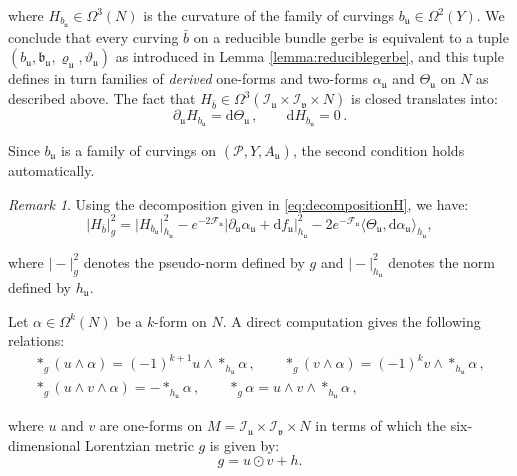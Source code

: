 \documentclass[10pt,a4paper,twoside,reqno]{amsart}
\theoremstyle{plain}
\theoremstyle{definition}
\theoremstyle{remark}
\newtheorem{remark}[thm]{Remark}
\def\dd{\mathrm{d}}
\def\cI{\mathcal{I}}
\def\cP{\mathcal{P}}
\def\cP{\mathcal{P}}
\def\cF{\mathcal{F}}
\def\dd{\mathrm{d}}
\def\fru{\mathfrak{u}}
\def\frv{\mathfrak{v}}
\begin{document}
\noindent
where $H_{b_{\fru}} \in \Omega^3(N)$ is the curvature of the family of curvings $b_{\fru}\in \Omega^2(Y)$. We conclude that every curving $\bar{b}$ on a reducible bundle gerbe is equivalent to a tuple $(b_{\fru}, \mathfrak{b}_{\fru}, \varrho_{\fru}, \vartheta_{\fru})$ as introduced in Lemma \ref{lemma:reduciblegerbe}, and this tuple defines in turn families of \emph{derived} one-forms and two-forms $\alpha_{\fru}$ and $\Theta_{\fru}$ on $N$ as described above. The fact that $H_{\bar{b}}\in \Omega^3(\cI_{\fru}\times \cI_{\frv} \times N)$ is closed translates into:
\begin{equation}
\label{eq:closedimplication}
\partial_{\fru} H_{b_{\fru}} = \dd \Theta_{\fru}\, , \qquad \dd H_{b_{\fru}} = 0 \, .
\end{equation}

\noindent
Since $b_{\fru}$ is a family of curvings on $(\cP, Y, A_{\fru})$, the second condition holds automatically.

\begin{remark}
Using the decomposition given in \eqref{eq:decompositionH}, we have:
\begin{equation*}
\vert H_{\bar{b}}\vert_g^2 = \vert H_{b_{\fru}}\vert_{h_\fru}^2  - e^{-2\cF_\fru} \vert \partial_{\fru}\alpha_{\fru} +\dd f_\fru \vert^2_{h_\fru}    -2 e^{-\cF_\fru} \langle \Theta_{\fru} , \dd \alpha_{\fru}\rangle_{h_\fru},
\end{equation*}

\noindent
where $\vert - \vert_g^2$ denotes the pseudo-norm defined by $g$ and $\vert - \vert_{h_\fru}^2$ denotes the norm defined by $h_\fru$.
\end{remark}
 
\noindent
Let $\alpha\in \Omega^k(N)$ be a $k$-form on $N$. A direct computation gives the following relations:
\begin{gather*}
\ast_g (u\wedge \alpha) = (-1)^{k+1} u\wedge \ast_{h_\fru}\alpha\, , \qquad \ast_g (v\wedge \alpha) = (-1)^{k} v\wedge \ast_{h_\fru}\alpha\, ,\\
\ast_g (u\wedge v \wedge \alpha) = -\ast_{h_\fru} \alpha\, , \qquad \ast_g \alpha = u\wedge v \wedge \ast_{h_\fru}\alpha\, ,
\end{gather*}

\noindent
where $u$ and $v$ are one-forms on $M = \cI_{\fru}\times \cI_{\frv}\times N$ in terms of which the six-dimensional Lorentzian metric $g$ is given by:
\begin{equation*}
g = u\odot v + h.
\end{equation*}
\end{document}

